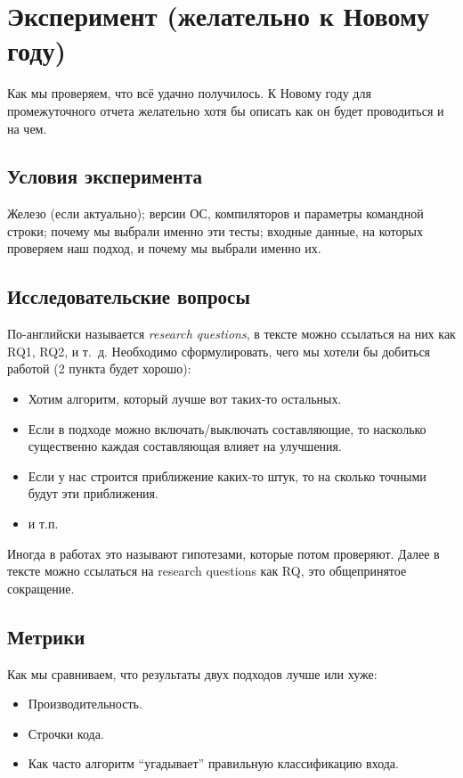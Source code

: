 
\section{Эксперимент (желательно к Новому году)}
Как мы проверяем, что  всё удачно получилось.  К Новому году для промежуточного отчета желательно хотя бы описать как он будет прово\-диться и на чем.

\subsection{Условия эксперимента}
Железо (если актуально);  версии ОС, компиляторов и параметры командной строки; почему мы выбрали именно эти тесты; входные дан\-ные, на которых проверяем наш подход, и почему мы выбрали именно их.

\subsection{Исследовательские вопросы }
По-английски называется \emph{research questions}, в тексте можно ссылаться на них как RQ1, RQ2, и т.~д.
Необходимо сформулировать, чего мы хотели бы добиться работой (2 пункта будет хорошо):

\begin{itemize}
\item Хотим алгоритм, который лучше вот таких-то остальных.
\item Если в подходе можно включать/выключать составляющие, то насколько существенно каждая составляющая влияет на улучшения.
\item Если у нас строится приближение каких-то штук, то на сколько точными будут эти приближения.
\item и т.п.
\end{itemize}

Иногда в работах это называют гипотезами, которые потом проверяют. Далее в тексте можно ссылаться на research questions как \textsc{RQ}, это обще\-при\-нятое сокращение.

\subsection{Метрики}

Как мы сравниваем, что результаты двух подходов лучше или хуже:
\begin{itemize}
\item Производительность.
\item Строчки кода.
\item Как часто алгоритм ``угадывает'' правильную классификацию входа.
\end{itemize}

